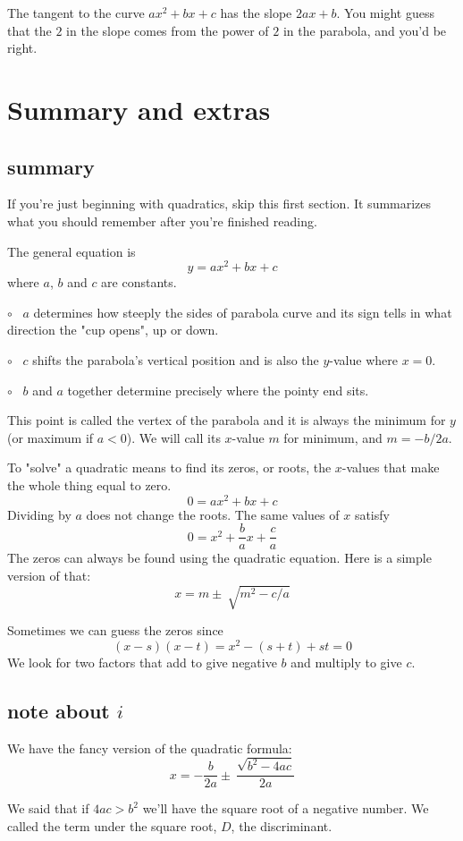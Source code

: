 \documentclass[11pt, oneside]{article}
\begin{document}
The tangent to the curve $ax^2 + bx + c$ has the slope $2ax + b$.  You might guess that the $2$ in the slope comes from the power of $2$ in the parabola, and you'd be right.

\section*{Summary and extras}

\subsection*{summary}
If you're just beginning with quadratics, skip this first section.  It summarizes what you should remember after you're finished reading.  

The general equation is
\[ y = ax^2 + bx + c \]
where $a$, $b$ and $c$ are constants. 

$\circ$ \ $a$ determines how steeply the sides of parabola curve and its sign tells in what direction the "cup opens", up or down.  

$\circ$ \ $c$ shifts the parabola's vertical position and is also the $y$-value where $x = 0$.

$\circ$ \ $b$ and $a$ together determine precisely where the pointy end sits.  

This point is called the vertex of the parabola and it is always the minimum for $y$ (or maximum if $a < 0$).  We will call its $x$-value $m$ for minimum, and $m = -b/2a$.

To "solve" a quadratic means to find its zeros, or roots, the $x$-values that make the whole thing equal to zero.
\[ 0 = ax^2 + bx + c \]
Dividing by $a$ does not change the roots.  The same values of $x$ satisfy
\[ 0 = x^2 + \frac{b}{a} x + \frac{c}{a} \]
The zeros can always be found using the quadratic equation.  Here is a simple version of that:
\[ x = m \pm \ \sqrt{m^2 - c/a} \]

Sometimes we can guess the zeros since
\[ (x - s)(x - t) = x^2 - (s + t) + st = 0 \]
We look for two factors that add to give negative $b$ and multiply to give $c$.

\subsection*{note about $i$}
We have the fancy version of the quadratic formula:
\[ x = -\frac{b}{2a} \pm \ \frac{\sqrt{b^2 - 4ac}}{2a} \]

We said that if $4ac > b^2$ we'll have the square root of a negative number.  We called the term under the square root, $D$, the discriminant.
\end{document}
